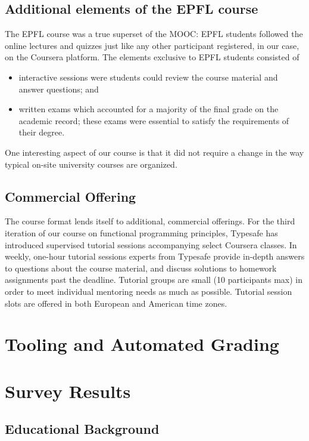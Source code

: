 \documentclass{sig-alternate}
\begin{document}
\subsection{Additional elements of the EPFL course}

The EPFL course was a true superset of the MOOC: EPFL students followed the
online lectures and quizzes just like any other participant registered, in our
case, on the Coursera platform. The elements exclusive to EPFL students
consisted of

\begin{itemize}
\item interactive sessions were students could review the course material and 
  answer questions; and
\item written exams which accounted for a majority of the final grade on the 
  academic record; these exams were essential to satisfy the requirements of 
  their degree.
\end{itemize}

One interesting aspect of our course is that it did not require a change in
the way typical on-site university courses are organized.

\subsection{Commercial Offering}

The course format lends itself to additional, commercial offerings. For the
third iteration of our course on functional programming principles, Typesafe
has introduced supervised tutorial sessions accompanying select Coursera
classes. In weekly, one-hour tutorial sessions experts from Typesafe provide
in-depth answers to questions about the course material, and discuss solutions
to homework assignments past the deadline. Tutorial groups are small (10
participants max) in order to meet individual mentoring needs as much as
possible. Tutorial session slots are offered in both European and American
time zones.


\section{Tooling and Automated Grading}

\section{Survey Results}

\subsection{Educational Background}
\end{document}
